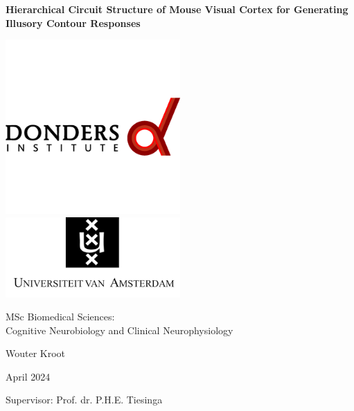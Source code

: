 \documentclass[12pt]{article}
\begin{document}
\captionsetup{font=small}

\begin{titlepage}
\centering

{\LARGE\bfseries Hierarchical Circuit Structure of Mouse Visual Cortex for Generating Illusory Contour Responses\par}


\includegraphics[width=0.5\textwidth]{figures/donders_logo.png}
\includegraphics[width=0.5\textwidth]{figures/uva_logo.png}
\begin{center}
  MSc Biomedical Sciences:\\
  Cognitive Neurobiology and Clinical Neurophysiology
\end{center}

\vspace{10pt} %

{\large Wouter Kroot\par}
\vspace{5pt} %
{\large April 2024\par}
\vspace{5pt}
{\large Supervisor: Prof. dr. P.H.E. Tiesinga}

\end{titlepage}

\newpage
\end{document}
